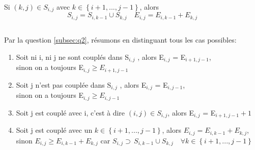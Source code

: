 \documentclass[french]{article}
\begin{document}
	\subsubsection{}
	Si $\left(k,j\right)\in S_{i,j}$ avec $k\in\left\{ i+1,...,j-1\right\} $, alors
	\[
	S_{i,j}= S_{i,k-1}\cup S_{k,j} \quad E_{i,j} = E_{i,k-1} + E_{k,j} 
	\]

\subsection{}
	\subsubsection{}
		Par la question \ref{subsec:q2}, résumons en distinguant tous les cas possibles:
	
		\begin{enumerate}  
		\item \label{itm:1}
			 Soit ni i, ni j ne sont couplés dans S$_{i,j}$ , alors E$_{i,j}$ = E$_{i+1,j-1}$, \\
			sinon on a toujours E$_{i,j} \geq E_{i+1,j-1}$
		\item Soit j n'est pas couplée dans S$_{i,j}$ , alors  E$_{i,j}$ = E$_{i,j-1}$, \\
			sinon on a toujours E$_{i,j} \geq E_{i,j-1}$
		\item Soit j est couplé avec i, c'est à dire $\left(i,j\right)\in S_{i,j}$, alors E$_{i,j}$  = E$_{i+1,j-1}+1$
		\item Soit j est couplé avec un $k\in\left\{ i+1,...,j-1\right\} $, alors $E_{i,j} = E_{i,k-1} + E_{k,j}$,\\ sinon $E_{i,j} \geq E_{i,k-1} + E_{k,j}$ car $S_{i,j} \supset \, S_{i,k-1}\cup S_{k,j}\quad \forall k \in\left\{ i+1,...,j-1\right\}$
		\end{enumerate}
		
\end{document}
